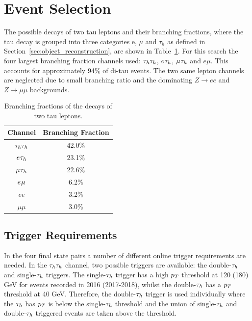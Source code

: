 \section{Event Selection}

The possible decays of two tau leptons and their branching fractions, where the tau decay is grouped into three categories e, $\mu$ and $\tau_h$ as defined in Section~\ref{sec:object_reconstruction}, are shown in Table~\ref{tab:ditau_br}. 
For this search the four largest branching fraction channels used: $\tau_{h}\tau_{h}$, $e_{}\tau_{h}$, $\mu_{}\tau_{h}$ and $e\mu$.
This accounts for approximately 94\% of di-tau events.
The two same lepton channels are neglected due to small branching ratio and the dominating $Z\rightarrow ee$ and $Z\rightarrow \mu\mu$ backgrounds. \\

\begin{table}[!hbtp]
    \centering
    \begin{tabular}{|c|c|}
         \hline
         Channel & Branching Fraction  \\
         \hline
         \hline
         $\tau_{h}\tau_{h}$ & 42.0\% \\
         $e_{}\tau_{h}$ & 23.1\% \\
         $\mu_{}\tau_{h}$ & 22.6\% \\
         $e_{}\mu_{}$ & 6.2\% \\
         $e e$ & 3.2\% \\
         $\mu \mu$ & 3.0\% \\
         \hline
    \end{tabular}
    \caption{Branching fractions of the decays of two tau leptons.}
    \label{tab:ditau_br}
\end{table}

\subsection{Trigger Requirements}

In the four final state pairs a number of different online trigger requirements are needed.
In the $\tau_{h}\tau_{h}$ channel, two possible triggers are available: the double-$\tau_{h}$ and single-$\tau_{h}$ triggers.
The single-$\tau_{h}$ trigger has a high $p_{T}$ threshold at 120 (180) GeV for events recorded in 2016 (2017-2018), whilst the double-$\tau_{h}$ has a $p_{T}$ threshold at 40 GeV.
Therefore, the double-$\tau_{h}$ trigger is used individually where the $\tau_{h}$ has $p_{T}$ is below the single-$\tau_{h}$ threshold and the union of single-$\tau_{h}$ and double-$\tau_{h}$ triggered events are taken above the threshold. \\

